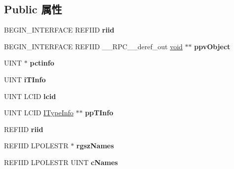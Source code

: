 \subsection*{Public 属性}
\begin{DoxyCompactItemize}
\item 
\mbox{\label{struct_i_ms_tsc_debug_vtbl_a1d4422c00ed445bd14074d4e70d27ad6}} 
B\+E\+G\+I\+N\+\_\+\+I\+N\+T\+E\+R\+F\+A\+CE R\+E\+F\+I\+ID {\bfseries riid}
\item 
\mbox{\label{struct_i_ms_tsc_debug_vtbl_af3d06ce2ff7a70f76f5de7ad348d7c31}} 
B\+E\+G\+I\+N\+\_\+\+I\+N\+T\+E\+R\+F\+A\+CE R\+E\+F\+I\+ID \+\_\+\+\_\+\+R\+P\+C\+\_\+\+\_\+deref\+\_\+out \hyperlink{interfacevoid}{void} $\ast$$\ast$ {\bfseries ppv\+Object}
\item 
\mbox{\label{struct_i_ms_tsc_debug_vtbl_a48eeef4e56e0609576b880ec9f9c0313}} 
U\+I\+NT $\ast$ {\bfseries pctinfo}
\item 
\mbox{\label{struct_i_ms_tsc_debug_vtbl_a98c6174a1f118d1f0c0169d01068cf56}} 
U\+I\+NT {\bfseries i\+T\+Info}
\item 
\mbox{\label{struct_i_ms_tsc_debug_vtbl_a5364abb9e2a0a2eef44966c1dab7c5ff}} 
U\+I\+NT L\+C\+ID {\bfseries lcid}
\item 
\mbox{\label{struct_i_ms_tsc_debug_vtbl_af8b9687c840a58a22692637eb3afbc5a}} 
U\+I\+NT L\+C\+ID \hyperlink{interface_i_type_info}{I\+Type\+Info} $\ast$$\ast$ {\bfseries pp\+T\+Info}
\item 
\mbox{\label{struct_i_ms_tsc_debug_vtbl_a20c125cca65fb253492f3176f0b3792b}} 
R\+E\+F\+I\+ID {\bfseries riid}
\item 
\mbox{\label{struct_i_ms_tsc_debug_vtbl_a5895f0a4f6915dfecf21fefd2d215e14}} 
R\+E\+F\+I\+ID L\+P\+O\+L\+E\+S\+TR $\ast$ {\bfseries rgsz\+Names}
\item 
\mbox{\label{struct_i_ms_tsc_debug_vtbl_a31a00ecf3f063121f35c1424bfd8cd2a}} 
R\+E\+F\+I\+ID L\+P\+O\+L\+E\+S\+TR U\+I\+NT {\bfseries c\+Names}

\end{DoxyCompactItemize}
